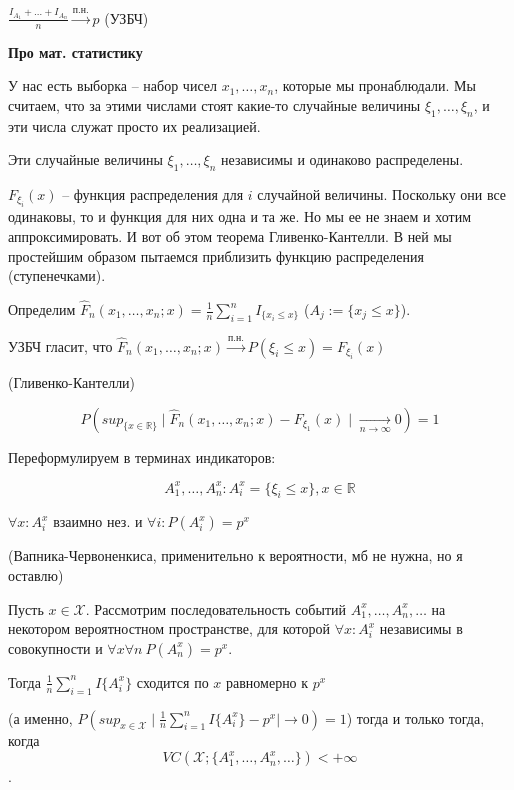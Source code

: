 $\frac{I_{A_1} + \ldots + I_{A_n}}{n} \stackrel{\text{п.н.}}{\longrightarrow} p$ (УЗБЧ)

\textbf{Про мат. статистику}

У нас есть выборка -- набор чисел $x_1, \ldots, x_n$, которые мы пронаблюдали. Мы считаем, что за этими числами стоят какие-то случайные величины $\xi_1, \ldots, \xi_n$, и эти числа служат просто их реализацией.

Эти случайные величины $\xi_1, \ldots, \xi_n$ независимы и одинаково распределены.

$F_{\xi_i}(x)$ -- функция распределения для $i$ случайной величины. Поскольку они все одинаковы, то и функция для них одна и та же. Но мы ее не знаем и хотим аппроксимировать. И вот об этом теорема Гливенко-Кантелли. В ней мы простейшим образом пытаемся приблизить функцию распределения (ступенечками).

Определим $\hat{F}_n(x_1, \ldots, x_n; x) = \frac{1}{n} \sum\limits_{i=1}^{n}I_{\{x_i \le x\}}$ ($A_j := \{x_j \le x\}$). 

УЗБЧ гласит, что $\hat{F}_n(x_1, \ldots, x_n; x) \stackrel{\text{п.н.}}{\longrightarrow} P(\xi_i \le x) = F_{\xi_i}(x)$

\Th (Гливенко-Кантелли)

$$P(sup_{\{x \in \mathbb{R}\}} \mid \hat{F}_n(x_1, \ldots, x_n; x) - F_{\xi_1}(x)\mid \xrightarrow[{n\rightarrow \infty}]{} 0) = 1$$

Переформулируем в терминах индикаторов:

$$A_1^x, \ldots, A_n^x : A_i^x = \{\xi_i \le x\}, x \in \mathbb{R}$$

$\forall x : A_i^x$ взаимно нез. и $\forall i : P(A_i^x) = p^x$

\Th (Вапника-Червоненкиса, применительно к вероятности, мб не нужна, но я оставлю)

Пусть $x \in \mathcal{X}$. Рассмотрим последовательность событий $A_1^x, \ldots, A_n^x, \ldots$ на некотором вероятностном пространстве, для которой $\forall x : A_i^x$ независимы в совокупности и $\forall x \forall n \ P(A_n^x) = p^x$.

Тогда $\frac{1}{n} \sum\limits_{i=1}^{n} I\{A_i^x\}$ сходится по $x$ равномерно к $p^x$ 

(а именно, $P(sup_{x \in \mathcal{X}} \mid \frac{1}{n} \sum\limits_{i=1}^{n} I\{A_i^x\} - p^x \mid \rightarrow 0) = 1$) тогда и только тогда, когда
$$VC(\mathcal{X};\{A_1^x, \ldots, A_n^x, \ldots \}) < + \infty$$.

\newpage{}

